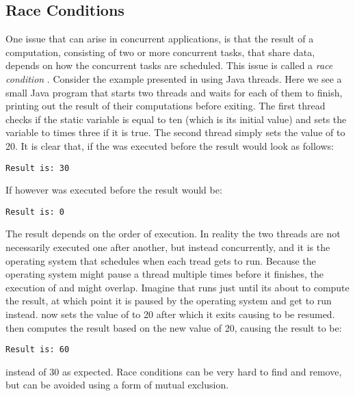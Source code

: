 \subsection{Race Conditions}
One issue that can arise in concurrent applications, is that the result of a computation, consisting of two or more concurrent tasks, that share data, depends on how the concurrent tasks are scheduled. This issue is called a \emph{race condition}
\cite[p. 983]{bryant2011computer}\cite[p. 115]{tanenbaum2008modern}. Consider the example presented in  using Java threads. Here we see a small Java program that starts two threads and waits for each of them to finish, printing out the result of their computations before exiting. The first thread checks if the static variable  is equal to ten (which is its initial value) and sets the  variable to  times three if it is true. The second thread simply sets the value of  to 20. It is clear that, if the  was executed before  the result would look as follows:
\begin{verbatim}
Result is: 30
\end{verbatim}
If however  was executed before  the result would be:
\begin{verbatim}
Result is: 0
\end{verbatim}
The result depends on the order of execution. In reality the two threads are not necessarily executed one after another, but instead concurrently, and it is the operating system that schedules when each tread gets to run. Because the operating system might pause a thread multiple times before it finishes, the execution of  and  might overlap. Imagine that  runs just until its about to compute the result, at which point it is paused by the operating system and  get to run instead.  now sets the value of  to 20 after which it exits causing  to be resumed.  then computes the result based on the new  value of 20, causing the result to be:
\begin{verbatim}
Result is: 60
\end{verbatim}
instead of 30 as expected. Race conditions can be very hard to find and remove, but can be avoided using a form of mutual exclusion.
